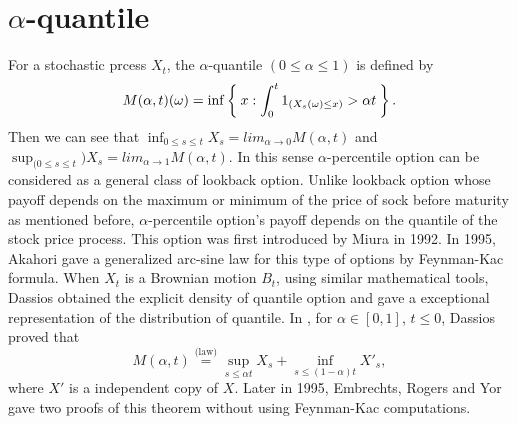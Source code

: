 \documentclass[11pt]{book}
\def\eqlaw{{\stackrel{\text{(law)}}{=}}}
\begin{document}
\section{$\alpha$-quantile}
For a stochastic prcess $X_t$,
the $\alpha$-quantile $( 0 \leq \alpha \leq 1)$ 
is defined by 
\[
M(\alpha,t)(\omega) = \inf\Set{x:\int_0^t 1_{(X_s (\omega)\leq x)} > \alpha t}.
\]
Then we can see that $\inf_{0\leq s \leq t}  X_s = lim_{\alpha\to 0}M(\alpha,t)$ and $\sup_{(0\leq s \leq t})  X_s = lim_{\alpha\to 1} M(\alpha, t)$. In this sense $\alpha$-percentile option can be considered as a general class of lookback option. Unlike lookback option whose payoff depends on the maximum or minimum of the price of sock before maturity as mentioned before, $\alpha$-percentile option's payoff depends on the quantile of the stock price process. This option was first introduced by Miura\cite{Miura} in 1992. In 1995, Akahori\cite{Akahori1995} gave a generalized arc-sine law for this type of options by Feynman-Kac formula.
When $X_{t}$ is a Brownian motion $B_t$, using similar mathematical tools, Dassios obtained the explicit density of quantile option and gave a exceptional representation of the distribution of quantile.  In \cite{Dassios1995}, for $\alpha\in[0,1]$, $t\leq 0$, Dassios proved that 
\begin{equation}\label{eq:Dassios}
M(\alpha, t) \eqlaw \sup_{s \leq \alpha t} X_s + \inf_{s\leq (1-\alpha)t} X'_s ,
\end{equation}
where $X'$ is a independent copy of $X$. Later in 1995, Embrechts, Rogers and Yor \cite{EmRoge1995} gave two proofs of this theorem without using Feynman-Kac computations. 
\end{document}
